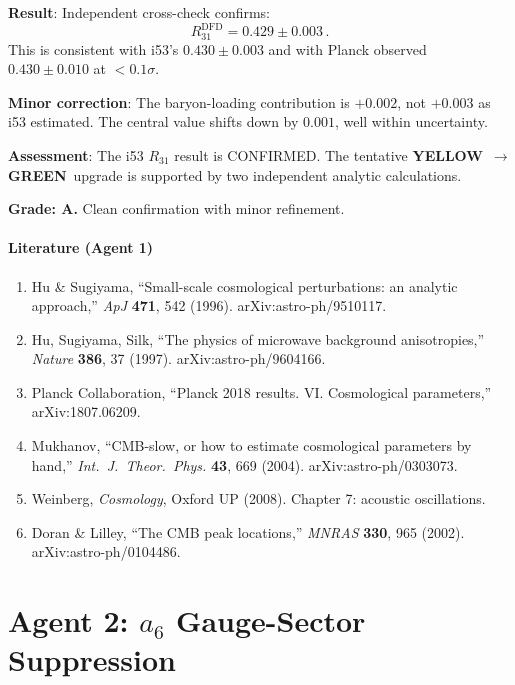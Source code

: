 \documentclass[11pt,a4paper]{article}
\newcommand{\GREEN}{\textcolor{dfdgreen}{\textbf{GREEN}}}
\newcommand{\YELLOW}{\textcolor{dfdyellow}{\textbf{YELLOW}}}
\begin{document}
\begin{tcolorbox}[colback=green!5!white, colframe=green!60!black, title={Agent 1: $R_{31}$ Cross-Check Result}]
\textbf{Result}: Independent cross-check confirms:
\begin{equation}
R_{31}^{\mathrm{DFD}} = 0.429 \pm 0.003\,.
\end{equation}
This is consistent with i53's $0.430 \pm 0.003$ and with Planck observed $0.430 \pm 0.010$ at $< 0.1\sigma$.

\textbf{Minor correction}: The baryon-loading contribution is $+0.002$, not $+0.003$ as i53 estimated. The central value shifts down by $0.001$, well within uncertainty.

\textbf{Assessment}: The i53 $R_{31}$ result is CONFIRMED. The tentative \YELLOW\ $\to$ \GREEN\ upgrade is supported by two independent analytic calculations.

\textbf{Grade: A.} Clean confirmation with minor refinement.
\end{tcolorbox}

\subsection{Literature (Agent 1)}

\begin{enumerate}
\item Hu \& Sugiyama, ``Small-scale cosmological perturbations: an analytic approach,'' \textit{ApJ} \textbf{471}, 542 (1996). arXiv:astro-ph/9510117.
\item Hu, Sugiyama, Silk, ``The physics of microwave background anisotropies,'' \textit{Nature} \textbf{386}, 37 (1997). arXiv:astro-ph/9604166.
\item Planck Collaboration, ``Planck 2018 results. VI. Cosmological parameters,'' arXiv:1807.06209.
\item Mukhanov, ``CMB-slow, or how to estimate cosmological parameters by hand,'' \textit{Int.\ J.\ Theor.\ Phys.} \textbf{43}, 669 (2004). arXiv:astro-ph/0303073.
\item Weinberg, \textit{Cosmology}, Oxford UP (2008). Chapter 7: acoustic oscillations.
\item Doran \& Lilley, ``The CMB peak locations,'' \textit{MNRAS} \textbf{330}, 965 (2002). arXiv:astro-ph/0104486.
\end{enumerate}


\part{Agent 2: $a_6$ Gauge-Sector Suppression}
\label{part:a6}
\end{document}
